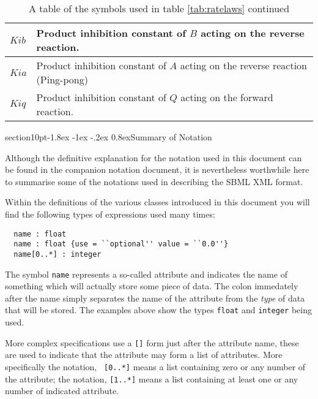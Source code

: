 \documentclass[10pt]{article}
\makeatletter
\renewcommand{\section}{\@startsection%
  {section}{1}{0pt}{-1.8ex \@plus -1ex \@minus -.2ex}%
  {0.8ex}{\normalfont\Large\bfseries}}
\makeatother
\begin{document}
\addtocounter{table}{-1}

\begin{table}[h]
\begin{tabular}{|p{2cm}|p{14cm}|}
\hline
$Kib    $&    Product inhibition constant of $B$ acting on the reverse reaction. \\ \hline
$Kia    $&      Product inhibition constant of $A$ acting on the reverse reaction (Ping-pong) \\ \hline
$Kiq    $&     Product inhibition constant of $Q$ acting on the forward reaction. \\ \hline
\end{tabular}
\caption{A table of the symbols used in table \ref{tab:ratelaws} continued}
\end{table}

\section{Summary of Notation}
\label{appendix:notation}

Although the definitive explanation for the notation used in this document
can be found in the companion notation document, it is nevertheless worthwhile
here to summarise some of the notations used in describing the SBML XML format.

Within the definitions of the various classes introduced in this
document you will find the following types of expressions used
many times:

\begin{verbatim}
  name : float
  name : float {use = ``optional'' value = ``0.0''}
  name[0..*] : integer
\end{verbatim}

The symbol {\tt name} represents a so-called attribute and indicates the name
of something which will actually store some piece of data. The colon immedately
after the name simply separates the name of the attribute from the {\em type}
of data that will be stored. The examples above show the types {\tt float} and
{\tt integer} being used.

More complex specifications use a {\tt []} form just after the
attribute name, these are used to indicate that the attribute may
form a list of attributes. More specifically the notation, {\tt
[0..*]} means a list containing zero or any number of the
attribute; the notation, {\tt [1..*]} means a list containing at
least one or any number of indicated attribute.
\end{document}
